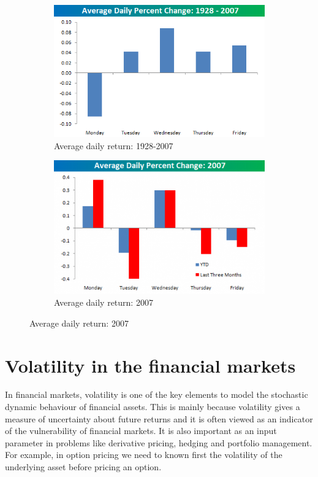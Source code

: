 \begin{description}
\begin{figure}[h!]
\centering
\begin{subfigure}[b]{0.45\textwidth}
 \includegraphics[width=\textwidth]{img/average_daily_change_1928_2007}
 \caption{Average daily return: 1928-2007}
 \label{fig:mondayeffect}
\end{subfigure}
\begin{subfigure}[b]{0.45\textwidth}
 \includegraphics[width=\textwidth]{img/thumb-average_daily_change_2007}
 \caption{Average daily return: 2007}
 \label{fig:mondayeffect2}
\end{subfigure}
\end{figure}
\end{description}



\section{Volatility in the financial markets}
In financial markets, volatility is one of the key elements to model the
stochastic dynamic behaviour of financial assets. This is mainly because
volatility gives a measure of uncertainty about future returns and it is often
viewed as an indicator of the vulnerability of financial markets. It is also
important as an input parameter in problems like derivative pricing, hedging
and portfolio management.  For example, in option pricing we need to known
first the volatility of the underlying asset before pricing an option. 

